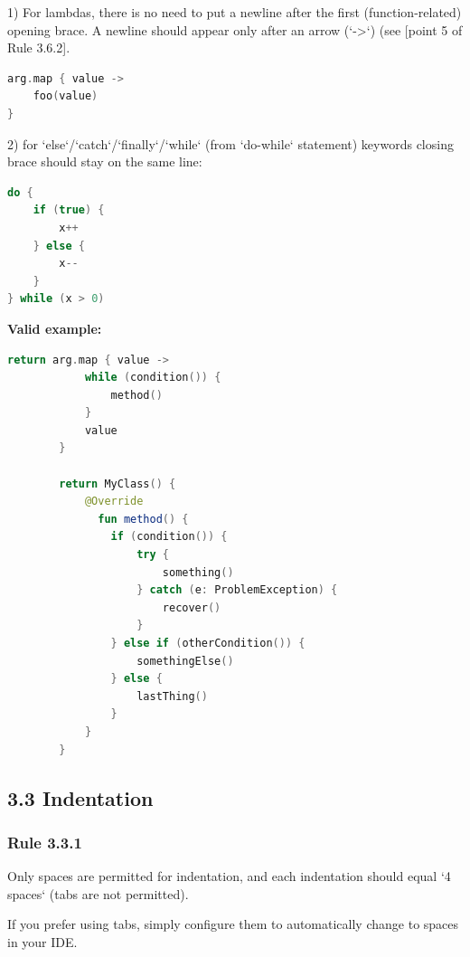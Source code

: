 1) For lambdas, there is no need to put a newline after the first (function-related) opening brace. A newline should appear only after an arrow (`->`) (see [point 5 of Rule 3.6.2].



\begin{lstlisting}[language=Kotlin]
arg.map { value ->
    foo(value)
}
\end{lstlisting}


2) for `else`/`catch`/`finally`/`while` (from `do-while` statement) keywords closing brace should stay on the same line:

\begin{lstlisting}[language=Kotlin]
do {
    if (true) {
        x++
    } else {
        x--
    }
} while (x > 0) 
\end{lstlisting}
 

\textbf{Valid example:}



\begin{lstlisting}[language=Kotlin]
        return arg.map { value ->
            while (condition()) {
                method()
            }
            value 
        }

        return MyClass() {
            @Override
              fun method() {
                if (condition()) {
                    try {
                        something()
                    } catch (e: ProblemException) {
                        recover()
                    }
                } else if (otherCondition()) {
                    somethingElse()
                } else {
                    lastThing()
                }
            }
        }
\end{lstlisting}


\subsection*{\textbf{3.3 Indentation}}

\subsubsection*{\textbf{Rule 3.3.1}}
\leavevmode\newline



Only spaces are permitted for indentation, and each indentation should equal `4 spaces` (tabs are not permitted).

If you prefer using tabs, simply configure them to automatically change to spaces in your IDE.

